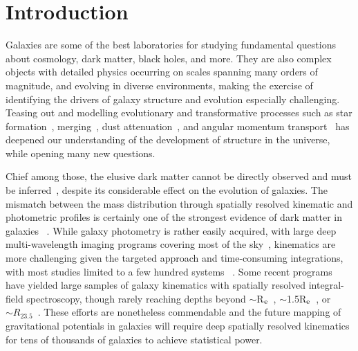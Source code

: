 \documentclass[twocolumn]{aastex631}
\begin{document}
\section{Introduction}\label{sec:intro}

Galaxies are some of the best laboratories for studying fundamental questions about cosmology, dark matter, black holes, and more.
They are also complex objects with detailed physics occurring on scales spanning many orders of magnitude, and evolving in diverse environments, making the exercise of identifying the drivers of galaxy structure and evolution especially challenging. 
Teasing out and modelling evolutionary and transformative processes such as star formation~\citep{Salpeter1955,Tojeiro2009,Conroy2013}, merging~\citep{Toomre1972,Naab2014}, dust attenuation~\citep{Holmberg1946,Burstein1984,Tully1998,Stone2021a}, and angular momentum transport~\citep{Lin1987,Obreschkow2014} has deepened our understanding of the development of structure in the universe, while opening many new questions.

Chief among those, the elusive dark matter cannot be directly observed and must be inferred~\citep{Faber1979,Bertone2018,Wechsler2018}, despite its considerable effect on the evolution of galaxies.
The mismatch between the mass distribution through spatially resolved kinematic and photometric profiles is certainly one of the strongest evidence of dark matter in galaxies ~\citep{Bosma1978,Faber1979,vanAlbada1986,Courteau2014}.
While galaxy photometry is rather easily acquired, with large deep multi-wavelength imaging programs covering most of the sky~\citep{York2000,Skrutskie2006,Lawrence2007,Lang2014,Bianchi2017,Dey2019,Ivezic2019},
kinematics are more challenging given the targeted approach and time-consuming integrations, with most studies limited to a few hundred systems ~\citep{Rubin1980,Mathewson1992,Courteau1997,Sofue2001}.
Some recent programs have yielded large samples of galaxy kinematics with spatially resolved integral-field spectroscopy, though rarely reaching depths beyond $\sim$R$_{\rm e}$~\citep[SAMI:][]{Croom2021}, $\sim$1.5R$_{\rm e}$~\citep[MaNGA:][]{Bundy2015}, or $\sim R_{23.5}$~\citep[CALIFA:][]{Sanchez2016}. 
These efforts are nonetheless commendable and the future mapping of gravitational potentials in galaxies will require deep spatially resolved kinematics for tens of thousands of galaxies to achieve statistical power.
\end{document}
